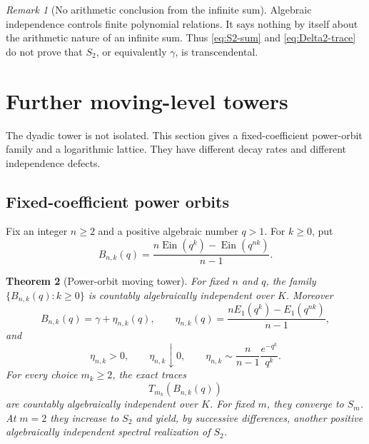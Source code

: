 \documentclass[11pt]{article}
\newtheorem{theorem}{Theorem}[section]
\theoremstyle{definition}
\theoremstyle{remark}
\newtheorem{remark}[theorem]{Remark}
\newcommand{\Ein}{\operatorname{Ein}}
\begin{document}
\begin{remark}[No arithmetic conclusion from the infinite sum]
Algebraic independence controls finite polynomial relations.  It says
nothing by itself about the arithmetic nature of an infinite sum.  Thus
\eqref{eq:S2-sum} and \eqref{eq:Delta2-trace} do not prove that \(S_2\), or
equivalently \(\gamma\), is transcendental.
\end{remark}

\section{Further moving-level towers}
\label{sec:other-towers}

The dyadic tower is not isolated.  This section gives a fixed-coefficient
power-orbit family and a logarithmic lattice.  They have different decay
rates and different independence defects.

\subsection{Fixed-coefficient power orbits}

Fix an integer \(n\ge2\) and a positive algebraic number \(q>1\).  For
\(k\ge0\), put
\begin{equation}\label{eq:Bnk}
 B_{n,k}(q)=
 \frac{n\Ein(q^k)-\Ein(q^{nk})}{n-1}.
\end{equation}

\begin{theorem}[Power-orbit moving tower]
\label{thm:power-orbit}
For fixed \(n\) and \(q\), the family
\(\{B_{n,k}(q):k\ge0\}\) is countably algebraically independent over \(K\).
Moreover
\begin{equation}\label{eq:eta-nk}
 B_{n,k}(q)=\gamma+\eta_{n,k}(q),\qquad
 \eta_{n,k}(q)=
 \frac{nE_1(q^k)-E_1(q^{nk})}{n-1},
\end{equation}
and
\begin{equation}\label{eq:eta-properties}
 \eta_{n,k}>0,\qquad
 \eta_{n,k}\downarrow0,\qquad
 \eta_{n,k}\sim
 \frac n{n-1}\frac{e^{-q^k}}{q^k}.
\end{equation}
For every choice \(m_k\ge2\), the exact traces
\[
 T_{m_k}(B_{n,k}(q))
\]
are countably algebraically independent over \(K\).  For fixed \(m\), they
converge to \(S_m\).  At \(m=2\) they increase to \(S_2\) and yield, by
successive differences, another positive algebraically independent spectral
realization of \(S_2\).
\end{theorem}
\end{document}
